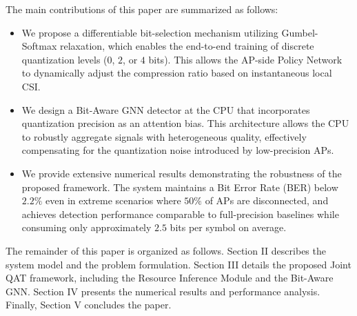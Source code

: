 The main contributions of this paper are summarized as follows:
\begin{itemize}
    \item We propose a differentiable bit-selection mechanism utilizing Gumbel-Softmax relaxation, which enables the end-to-end training of discrete quantization levels ($0$, $2$, or $4$ bits). This allows the AP-side Policy Network to dynamically adjust the compression ratio based on instantaneous local CSI.
    \item We design a Bit-Aware GNN detector at the CPU that incorporates quantization precision as an attention bias. This architecture allows the CPU to robustly aggregate signals with heterogeneous quality, effectively compensating for the quantization noise introduced by low-precision APs.
    \item We provide extensive numerical results demonstrating the robustness of the proposed framework. The system maintains a Bit Error Rate (BER) below $2.2\%$ even in extreme scenarios where $50\%$ of APs are disconnected, and achieves detection performance comparable to full-precision baselines while consuming only approximately $2.5$ bits per symbol on average.
\end{itemize}

The remainder of this paper is organized as follows. Section II describes the system model and the problem formulation. Section III details the proposed Joint QAT framework, including the Resource Inference Module and the Bit-Aware GNN. Section IV presents the numerical results and performance analysis. Finally, Section V concludes the paper.